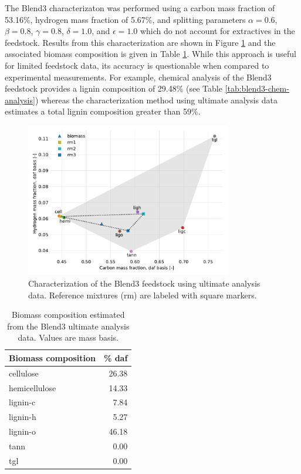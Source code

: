 The Blend3 characterizaton was performed using a carbon mass fraction of 53.16\%, hydrogen mass fraction of 5.67\%, and splitting parameters $\alpha = 0.6$, $\beta = 0.8$, $\gamma = 0.8$, $\delta = 1.0$, and $\epsilon = 1.0$ which do not account for extractives in the feedstock. Results from this characterization are shown in Figure \ref{fig:blend3-biocharact-ult} and the associated biomass composition is given in Table \ref{tab:blend3-biocomp-ult}. While this approach is useful for limited feedstock data, its accuracy is questionable when compared to experimental measurements. For example, chemical analysis of the Blend3 feedstock provides a lignin composition of 29.48\% (see Table \ref{tab:blend3-chem-analysis}) whereas the characterization method using ultimate analysis data estimates a total lignin composition greater than 59\%.

\begin{figure}[H]
    \centering
    \includegraphics[width=0.8\textwidth]{figures/blend3-biocharact-ult.pdf}
    \caption{Characterization of the Blend3 feedstock using ultimate analysis data. Reference mixtures (rm) are labeled with square markers.}
    \label{fig:blend3-biocharact-ult}
\end{figure}

\begin{table}[H]
    \centering
    \caption{Biomass composition estimated from the Blend3 ultimate analysis data. Values are mass basis.}
    \label{tab:blend3-biocomp-ult}
    \begin{tabular}{lr}
        \toprule
        Biomass composition & \% daf \\
        \midrule
        cellulose     & 26.38 \\
        hemicellulose & 14.33 \\
        lignin-c      & 7.84  \\
        lignin-h      & 5.27  \\
        lignin-o      & 46.18 \\
        tann          & 0.00  \\
        tgl           & 0.00  \\
        \bottomrule
    \end{tabular}
\end{table}

